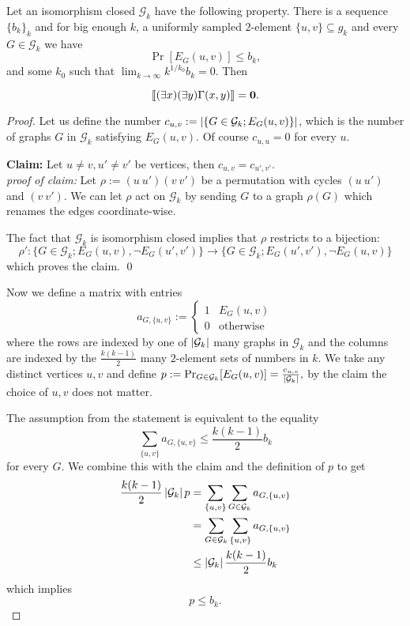 \begin{thrm}\label{thrmsparse}
Let an isomorphism closed $\mathcal{G}_k$ have the following property. There is a sequence $\{b_k\}_{k}$ and for big enough $k$, a uniformly sampled $2$-element $\{u,v\}\subseteq g_k$ and every $G\in\mathcal{G}_k$ we have
\[\Pr[E_G(u,v)]\leq b_k,\]
and some $k_0$ such that $\lim_{k\to\infty}k^{1/k_0}b_k = 0.$ Then

\[\llbracket(\exists x)(\exists y)\Gamma(x,y)\rrbracket=\textbf{0}.\]
\end{thrm}
\begin{proof}
Let us define the number $c_{u,v}:=\left|{\{G\in\mathcal{G}_k; E_G(u,v)\}}\right|$, which is the number of graphs $G$ in $\mathcal{G}_k$ satisfying $E_G(u,v)$. Of course $c_{u,u}=0$ for every $u$.

\vspace{0.5em}
\textbf{Claim:} Let $u\neq v,u'\neq v'$ be vertices, then $c_{u,v}=c_{u',v'}$.\\
\textit{proof of claim:} Let $\rho:=(u\:u')(v\:v')$ be a permutation with cycles $(u\:u')$ and $(v\:v')$. We can let $\rho$ act on $\mathcal{G}_k$ by sending $G$ to a graph $\rho(G)$ which renames the edges coordinate-wise.

The fact that $\mathcal{G}_k$ is isomorphism closed implies that $\rho$ restricts to a bijection:
\[\rho':\{G\in\mathcal{G}_k;E_G(u,v), \lnot E_G(u',v')\}\to \{G\in\mathcal{G}_k;E_G(u',v'),\lnot E_G(u,v)\}\]
which proves the claim. \qed
\vspace{0.5em}

Now we define a matrix with entries
\[a_{G,\{u,v\}}:=\begin{cases}1&E_G(u,v)\\0&\text{otherwise}\end{cases}\]
where the rows are indexed by one of $\left|{\mathcal{G}_k}\right|$ many graphs in $\mathcal{G}_k$ and the columns are indexed by the $\frac{k(k-1)}{2}$ many $2$-element sets of numbers in $k$. We take any distinct vertices $u,v$ and define $p:=\Pr_{G\in \mathcal{G}_k}[E_G(u,v)]=\frac{c_{u,v}}{\left|{\mathcal{G}_k}\right|},$ by the claim the choice of $u,v$ does not matter.

The assumption from the statement is equivalent to the equality 
\[\sum_{\{u,v\}}a_{G,\{u,v\}}\leq \frac{k(k-1)}{2}b_k\] 
for every $G$. We combine this with the claim and the definition of $p$ to get
\begin{align}
\frac{k(k-1)}{2}\left|{\mathcal{G}_k}\right|p&=\sum_{\{u,v\}}\sum_{G\in\mathcal{G}_k}a_{G,\{u,v\}}\\
&=\sum_{G\in\mathcal{G}_k}\sum_{\{u,v\}}a_{G,\{u,v\}}\\
&\leq \left|{\mathcal{G}_k}\right|\frac{k(k-1)}{2}b_k
\end{align}
which implies
\[p\leq b_k.\]


\end{proof}
